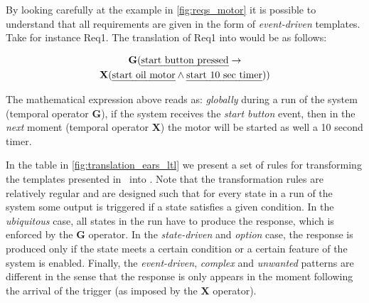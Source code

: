 By looking carefully at the example in \fig\ref{fig:reqs_motor} it is possible
to understand that all requirements are given in the form of \ears
\emph{event-driven} templates. Take for instance Req1. The translation of Req1
into \ltl would be as follows:

\begin{multline*}
\mathbf{G}(\text{\emph{start button pressed}} \rightarrow\\
\textbf{X}(\text{\emph{start oil motor}}\land \text{\emph{start 10 sec timer}}))
\end{multline*}

The mathematical expression above reads as: \emph{globally}
during a run of the system (temporal operator $\mathbf{G}$), if the system
receives the \emph{start button} event, then in the \emph{next} moment
(temporal operator $\mathbf{X}$) the motor will be started as well a 10 second timer.

In the table in \fig\ref{fig:translation_ears_ltl} we present a set of rules for
transforming the \ears templates presented in~\cite{EARS09} into \ltl. Note that
the transformation rules are relatively regular and are designed such that for
every state in a run of the system some output is triggered if a state satisfies
a given condition. In the \emph{ubiquitous} case, all states in the run have to
produce the response, which is enforced by the $\mathbf{G}$ operator. In the
\emph{state-driven} and \emph{option} case, the response is produced only if the
state meets a certain condition or a certain feature of the system is enabled.
Finally, the \emph{event-driven}, \emph{complex} and \emph{unwanted} patterns
are different in the sense that the response is only appears in the moment following
the arrival of the trigger (as imposed by the $\mathbf{X}$ operator).
